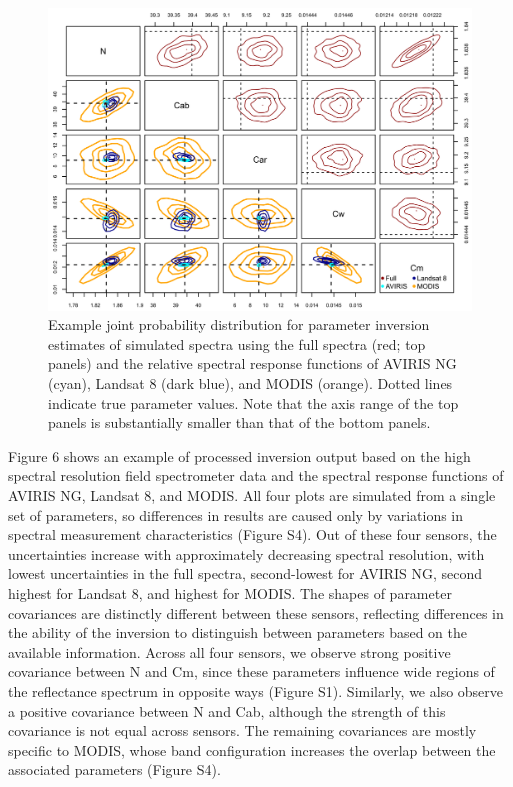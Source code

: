 \begin{figure}
  \centering
  \includegraphics[width=\textwidth]{2_rtm_inversion/figures/joint_posterior.pdf}
  \caption{%
    Example joint probability distribution for parameter inversion estimates of simulated spectra using the full spectra (red; top panels) and the relative spectral response functions of AVIRIS NG (cyan), Landsat 8 (dark blue), and MODIS (orange). 
    Dotted lines indicate true parameter values. Note that the axis range of the top panels is substantially smaller than that of the bottom panels.
  }\label{fig:pecanrtm-jointpost}
\end{figure}

Figure 6 shows an example of processed inversion output based on the high spectral resolution field spectrometer data and the spectral response functions of AVIRIS NG, Landsat 8, and MODIS\@.
All four plots are simulated from a single set of parameters, so differences in results are caused only by variations in spectral measurement characteristics (Figure S4). %
Out of these four sensors, the uncertainties increase with approximately decreasing spectral resolution, with lowest uncertainties in the full spectra, second-lowest for AVIRIS NG, second highest for Landsat 8, and highest for MODIS\@. %
The shapes of parameter covariances are distinctly different between these sensors, reflecting differences in the ability of the inversion to distinguish between parameters based on the available information.
Across all four sensors, we observe strong positive covariance between N and Cm, since these parameters influence wide regions of the reflectance spectrum in opposite ways (Figure S1). %
Similarly, we also observe a positive covariance between N and Cab, although the strength of this covariance is not equal across sensors.
The remaining covariances are mostly specific to MODIS, whose band configuration increases the overlap between the associated parameters (Figure S4). %

